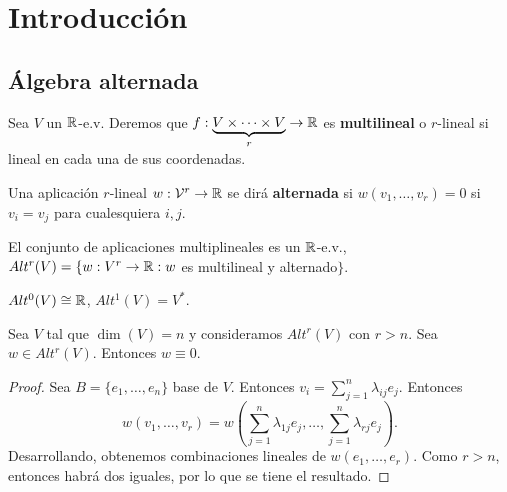 \documentclass[cursovd_portada.tex]{subfiles}
\begin{document}

\chapter{Introducción}
\section{Álgebra alternada}
\begin{defi}
Sea $V$ un $\mathbb{R}$-e.v. Deremos que $f:\underbrace{V\times\dots\times V}_{r}\to\mathbb{R}$ es \textbf{multilineal} o $r$-lineal si lineal en cada una de sus coordenadas.

Una aplicación $r$-lineal $w:\mathcal{V}^r\to\mathbb{R}$ se dirá \textbf{alternada} si $w(v_1,\dots, v_r)=0$ si $v_i=v_j$ para cualesquiera $i,j$. 
\end{defi}

El conjunto de aplicaciones multiplineales es un $\mathbb{R}$-e.v., $Alt^r(V)=\{w:V^r\to\mathbb{R}: w$ es multilineal y alternado$\}$. 
\begin{ej}
$Alt^0(V)\cong\mathbb{R}$, $Alt^1(V)=V^*$.
\end{ej}

\begin{lemma}
Sea $V$ tal que $\dim(V)=n$ y consideramos $Alt^r(V)$ con $r>n$. Sea $w\in Alt^r(V)$. Entonces $w\equiv 0$.
\end{lemma}
\begin{proof}
Sea $B=\{e_1,\dots, e_n\}$ base de $V$. Entonces $v_i=\sum_{j=1}^n\lambda_{ij}e_j$. Entonces
$$
w(v_1,\dots, v_r)=w(\sum_{j=1}^n\lambda_{1j}e_j,\dots,\sum_{j=1}^n\lambda_{rj}e_j).$$
Desarrollando, obtenemos combinaciones lineales de $w(e_1,\dots, e_r)$. Como $r>n$, entonces habrá dos iguales, por lo que se tiene el resultado.
\end{proof}
\end{document}
